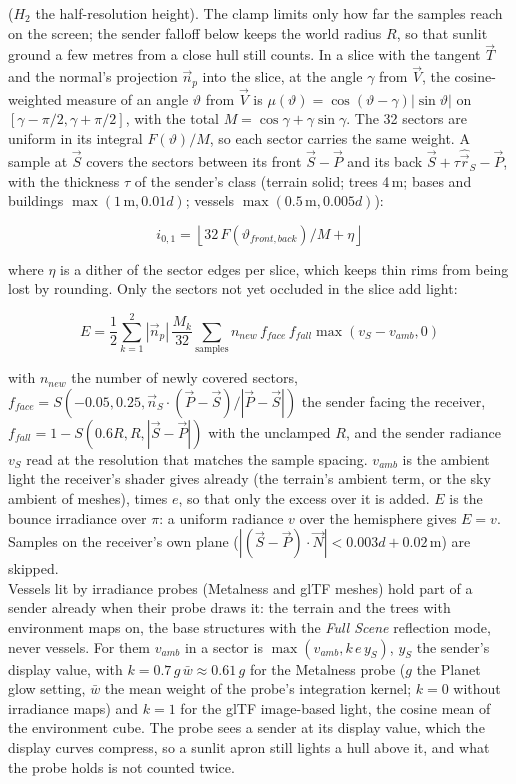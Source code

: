 \documentclass[Orbiter Technical Reference.tex]{subfiles}
\begin{document}
\begin{sloppypar}
\noindent
($H_{2}$ the half-resolution height). The clamp limits only how far the samples reach on the screen; the sender falloff below keeps the world radius $R$, so that sunlit ground a few metres from a close hull still counts. In a slice with the tangent $\vec{T}$ and the normal's projection $\vec{n}_{p}$ into the slice, at the angle $\gamma$ from $\vec{V}$, the cosine-weighted measure of an angle $\vartheta$ from $\vec{V}$ is $\mu(\vartheta) = \cos(\vartheta - \gamma)|\sin\vartheta|$ on $[\gamma - \pi/2, \gamma + \pi/2]$, with the total $M = \cos\gamma + \gamma\sin\gamma$. The 32 sectors are uniform in its integral $F(\vartheta)/M$, so each sector carries the same weight. A sample at $\vec{S}$ covers the sectors between its front $\vec{S} - \vec{P}$ and its back $\vec{S} + \tau\hat{\vec{r}}_{S} - \vec{P}$, with the thickness $\tau$ of the sender's class (terrain solid; trees 4\,m; bases and buildings $\max(1\,\mathrm{m}, 0.01d)$; vessels $\max(0.5\,\mathrm{m}, 0.005d)$):

\[ i_{0,1} = \left\lfloor 32\,F(\vartheta_{front,back})/M + \eta \right\rfloor \]

\noindent
where $\eta$ is a dither of the sector edges per slice, which keeps thin rims from being lost by rounding. Only the sectors not yet occluded in the slice add light:

\[ E = \frac{1}{2} \sum_{k=1}^{2} |\vec{n}_{p}|\,\frac{M_{k}}{32} \sum_{\mathrm{samples}} n_{new}\, f_{face}\, f_{fall} \max(v_{S} - v_{amb}, 0) \]

\noindent
with $n_{new}$ the number of newly covered sectors, $f_{face} = S(-0.05, 0.25, \vec{n}_{S}\cdot(\vec{P} - \vec{S})/|\vec{P} - \vec{S}|)$ the sender facing the receiver, $f_{fall} = 1 - S(0.6R, R, |\vec{S} - \vec{P}|)$ with the unclamped $R$, and the sender radiance $v_{S}$ read at the resolution that matches the sample spacing. $v_{amb}$ is the ambient light the receiver's shader gives already (the terrain's ambient term, or the sky ambient of meshes), times $e$, so that only the excess over it is added. $E$ is the bounce irradiance over $\pi$: a uniform radiance $v$ over the hemisphere gives $E = v$. Samples on the receiver's own plane ($|(\vec{S} - \vec{P})\cdot\vec{N}| < 0.003d + 0.02$\,m) are skipped.\\
Vessels lit by irradiance probes (Metalness and glTF meshes) hold part of a sender already when their probe draws it: the terrain and the trees with environment maps on, the base structures with the \textit{Full Scene} reflection mode, never vessels. For them $v_{amb}$ in a sector is $\max(v_{amb}, k\,e\,y_{S})$, $y_{S}$ the sender's display value, with $k = 0.7\,g\,\bar{w} \approx 0.61\,g$ for the Metalness probe ($g$ the Planet glow setting, $\bar{w}$ the mean weight of the probe's integration kernel; $k = 0$ without irradiance maps) and $k = 1$ for the glTF image-based light, the cosine mean of the environment cube. The probe sees a sender at its display value, which the display curves compress, so a sunlit apron still lights a hull above it, and what the probe holds is not counted twice.


\end{sloppypar}
\end{document}

